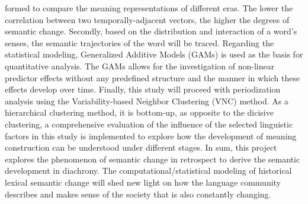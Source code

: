 formed to compare the meaning representations of different eras. The lower the correlation between two temporally-adjacent vectors, the higher the degrees of semantic change. Secondly, based on the distribution and interaction of a word's senses, the semantic trajectories of the word will be traced. Regarding the statistical modeling, Generalized Additive Models (GAMs) is used as the basis for quantitative analysis. The GAMs allows for the investigation of non-linear predictor effects without any predefined structure and the manner in which these effects develop over time. Finally, this study will proceed with periodization analysis using the Variability-based Neighbor Clustering (VNC) method. As a hierarchical clustering method, it is bottom-up, as opposite to the dicisive clustering, a comprehensive evaluation of the influence of the selected linguistic factors in this study is implemented to explore how the development of meaning construction can be understood under different stages. In sum, this project explores the phenomenon of semantic change in retrospect to derive the semantic development in diachrony. The computational/statistical modeling of historical lexical semantic change will shed new light on how the language community describes and makes sense of the society that is also constantly changing.


